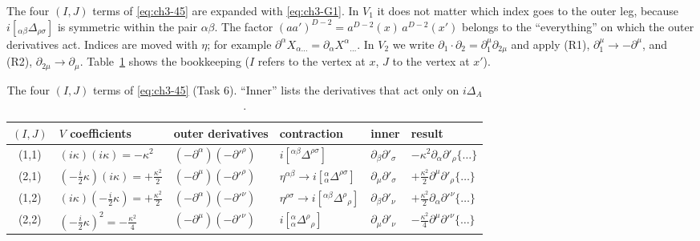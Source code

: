 The four $(I,J)$ terms of \eqref{eq:ch3-45} are expanded with \eqref{eq:ch3-G1}. In $V_1$ it does not matter which index goes to the outer leg,
because $i[{}_{\alpha\beta}\Delta_{\rho\sigma}]$ is symmetric within the pair $\alpha\beta$. The factor $(aa')^{D-2}=a^{D-2}(x)\,a^{D-2}(x')$ belongs to the
``everything'' on which the outer derivatives act. Indices are moved with $\eta$; for example $\partial^\alpha X_{\alpha\ldots}=\partial_\alpha X^\alpha{}_{\ldots}$.
In $V_2$ we write $\partial_1\!\cdot\partial_2=\partial_1^\mu\partial_{2\mu}$ and apply (R1), $\partial_1^\mu\to-\partial^\mu$, and (R2), $\partial_{2\mu}\to\partial_\mu$.
Table~\ref{tab:ch3-IJ} shows the bookkeeping ($I$ refers to the vertex at $x$, $J$ to the vertex at $x'$).

\begin{table}[h]
\centering\small
\renewcommand{\arraystretch}{1.25}
\begin{tabular}{clllll}
\toprule
$(I,J)$ & $V$ coefficients & outer derivatives & contraction & inner & result\\
\midrule
(1,1) & $(i\kappa)(i\kappa)=-\kappa^2$ & $(-\partial^\alpha)(-\partial'^\rho)$ & $i[{}^{\alpha\beta}\Delta^{\rho\sigma}]$ & $\partial_\beta\partial'_\sigma$ & $-\kappa^2\partial_\alpha\partial'_\rho\{\ldots\}$\\
(2,1) & $(-\tfrac i2\kappa)(i\kappa)=+\tfrac{\kappa^2}2$ & $(-\partial^\mu)(-\partial'^\rho)$ & $\eta^{\alpha\beta}\to i[{}^\alpha_\alpha\Delta^{\rho\sigma}]$ & $\partial_\mu\partial'_\sigma$ & $+\tfrac{\kappa^2}2\partial^\mu\partial'_\rho\{\ldots\}$\\
(1,2) & $(i\kappa)(-\tfrac i2\kappa)=+\tfrac{\kappa^2}2$ & $(-\partial^\alpha)(-\partial'^\nu)$ & $\eta^{\rho\sigma}\to i[{}^{\alpha\beta}\Delta^\rho{}_\rho]$ & $\partial_\beta\partial'_\nu$ & $+\tfrac{\kappa^2}2\partial_\alpha\partial'^\nu\{\ldots\}$\\
(2,2) & $(-\tfrac i2\kappa)^2=-\tfrac{\kappa^2}4$ & $(-\partial^\mu)(-\partial'^\nu)$ & $i[{}^\alpha_\alpha\Delta^\rho{}_\rho]$ & $\partial_\mu\partial'_\nu$ & $-\tfrac{\kappa^2}4\partial^\mu\partial'^\nu\{\ldots\}$\\
\bottomrule
\end{tabular}
\caption{The four $(I,J)$ terms of \eqref{eq:ch3-45} (Task 6). ``Inner'' lists the derivatives that act only on $i\Delta_A$.}
\label{tab:ch3-IJ}
\end{table}

